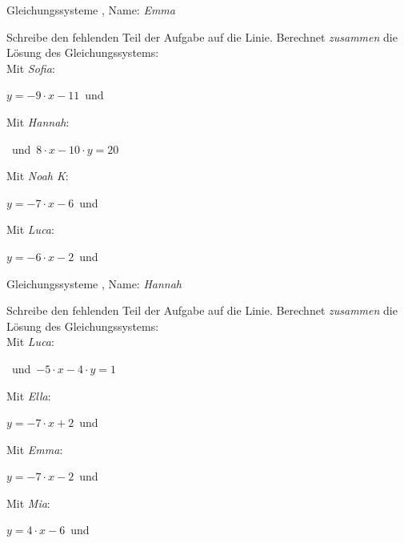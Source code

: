 \newpage
\begin{center}\large Gleichungssysteme
, Name: \emph{Emma}\end{center}
Schreibe den fehlenden Teil der Aufgabe auf die Linie. Berechnet \emph{zusammen} die Lösung des Gleichungssystems:
\\
\vfill Mit \emph{Sofia}:
\begin{center}$y=-9\cdot x-11$\mbox{ }und\mbox{ }
\underline{}\end{center}
\vfill Mit \emph{Hannah}:
\begin{center}\underline{}
\mbox{ }und\mbox{ }$8\cdot x-10\cdot y=20$\end{center}
\vfill Mit \emph{Noah K}:
\begin{center}$y=-7\cdot x-6$\mbox{ }und\mbox{ }
\underline{}\end{center}
\vfill Mit \emph{Luca}:
\begin{center}$y=-6\cdot x-2$\mbox{ }und\mbox{ }
\underline{}\end{center}
\newpage
\begin{center}\large Gleichungssysteme
, Name: \emph{Hannah}\end{center}
Schreibe den fehlenden Teil der Aufgabe auf die Linie. Berechnet \emph{zusammen} die Lösung des Gleichungssystems:
\\
\vfill Mit \emph{Luca}:
\begin{center}\underline{}
\mbox{ }und\mbox{ }$-5\cdot x-4\cdot y=1$\end{center}
\vfill Mit \emph{Ella}:
\begin{center}$y=-7\cdot x+2$\mbox{ }und\mbox{ }\underline{}
\end{center}
\vfill Mit \emph{Emma}:
\begin{center}$y=-7\cdot x-2$\mbox{ }und\mbox{ }\underline{}
\end{center}
\vfill Mit \emph{Mia}:
\begin{center}$y=4\cdot x-6$\mbox{ }und\mbox{ }
\underline{}\end{center}
